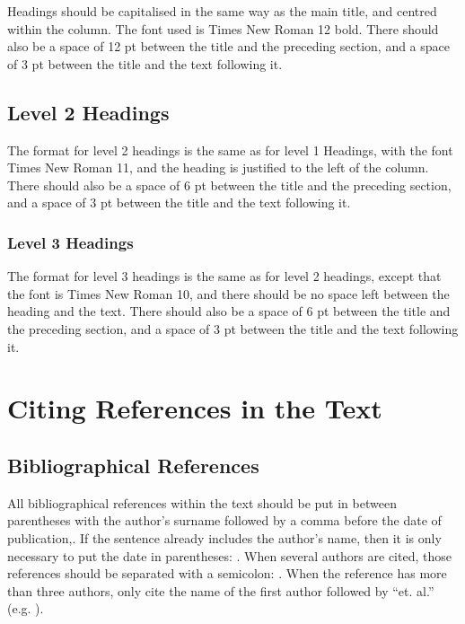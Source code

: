 \documentclass[10pt, a4paper]{article}
\begin{document}
Headings should be capitalised in the same way as the main title, and centred
within the column. The font used is Times New Roman 12 bold. There should
also be a space of 12 pt between the title and the preceding section, and
a space of 3 pt between the title and the text following it.

\subsection{Level 2 Headings}

The format for level 2 headings is the same as for level 1 Headings, with the
font Times New Roman 11, and the heading is justified to the left of the column.
There should also be a space of 6 pt between the title and the preceding
section, and a space of 3 pt between the title and the text following it.

\subsubsection{Level 3 Headings}

The format for level 3 headings is the same as for level 2 headings, except that
the font is Times New Roman 10, and there should be no space left between the
heading and the text. There should also be a space of 6 pt between the title and
the preceding section, and a space of 3 pt between the title and the text
following it.

%

\section{Citing References in the Text}

\subsection{Bibliographical References}

All bibliographical references within the text should be put in between
parentheses with the author's surname followed by a comma before the date
of publication,\cite{Martin-90}. If the sentence already includes the author's
name, then it is only necessary to put the date in parentheses:
. When several authors are cited, those references should be
separated with a semicolon: \cite{Martin-90,CastorPollux-92}. When the reference
has more than three authors, only cite the name of the first author followed by
``et. al.'' (e.g. \cite{Superman-Batman-Catwoman-Spiderman-00}).
\end{document}

